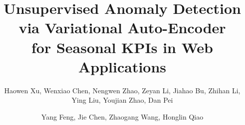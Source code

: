 \documentclass[sigconf]{acmart}
\begin{document}
\title{Unsupervised Anomaly Detection via Variational Auto-Encoder \\for Seasonal KPIs in Web Applications}


\author{Haowen Xu, Wenxiao Chen, Nengwen Zhao, Zeyan Li, Jiahao Bu, Zhihan Li, Ying Liu, Youjian Zhao, Dan Pei}
\author{Yang Feng, Jie Chen, Zhaogang Wang, Honglin Qiao}

%

%
%
%
%
%
%
\end{document}
